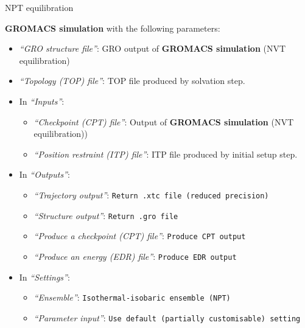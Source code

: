 \documentclass[twocolumn]{bmcart}%
\providecommand{\tightlist}{%
  \setlength{\itemsep}{0pt}\setlength{\parskip}{0pt}}
\begin{document}
\begin{handson_box_colour}{NPT
equilibration}


  \textbf{GROMACS simulation} with the following parameters:

  \begin{itemize}
  \tightlist
  \item
    \emph{``GRO structure file''}: GRO output of \textbf{GROMACS
    simulation} (NVT equilibration)
  \item
    \emph{``Topology (TOP) file''}: TOP file produced by solvation step.
  \item
    In \emph{``Inputs''}:

    \begin{itemize}
    \tightlist
    \item
      \emph{``Checkpoint (CPT) file''}: Output of \textbf{GROMACS
      simulation} (NVT equilibration))
    \item
      \emph{``Position restraint (ITP) file''}: ITP file produced by
      initial setup step.
    \end{itemize}
  \item
    In \emph{``Outputs''}:

    \begin{itemize}
    \tightlist
    \item
      \emph{``Trajectory output''}:
      \texttt{Return\ .xtc\ file\ (reduced\ precision)}
    \item
      \emph{``Structure output''}: \texttt{Return\ .gro\ file}
    \item
      \emph{``Produce a checkpoint (CPT) file''}:
      \texttt{Produce\ CPT\ output}
    \item
      \emph{``Produce an energy (EDR) file''}:
      \texttt{Produce\ EDR\ output}
    \end{itemize}
  \item
    In \emph{``Settings''}:

    \begin{itemize}
    \tightlist
    \item
      \emph{``Ensemble''}: \texttt{Isothermal-isobaric\ ensemble\ (NPT)}
    \item
      \emph{``Parameter input''}:
      \texttt{Use\ default\ (partially\ customisable)\ setting}


\end{itemize}
\end{itemize}
\end{handson_box_colour}
\end{document}
